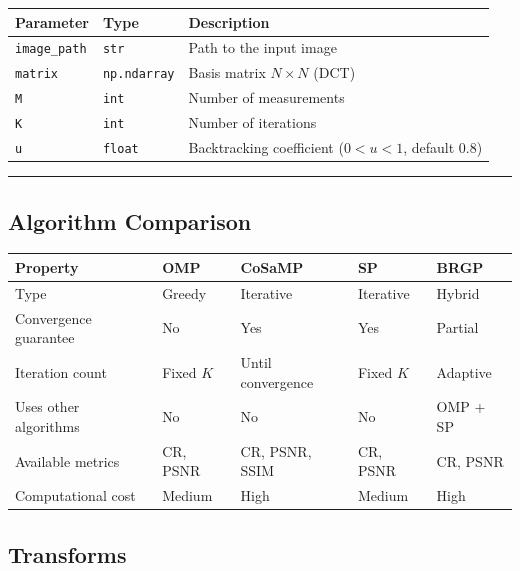\documentclass[12pt,a4paper]{article}
\newcommand{\cs}[1]{\texttt{#1}}          %
\begin{document}
\begin{center}
\begin{tabular}{lll}
  \toprule
  Parameter        & Type            & Description \\
  \midrule
  \cs{image\_path} & \cs{str}        & Path to the input image \\
  \cs{matrix}      & \cs{np.ndarray} & Basis matrix $N \times N$ (DCT) \\
  \cs{M}           & \cs{int}        & Number of measurements \\
  \cs{K}           & \cs{int}        & Number of iterations \\
  \cs{u}           & \cs{float}      & Backtracking coefficient ($0 < u < 1$, default 0.8) \\
  \bottomrule
\end{tabular}
\end{center}

\bigskip\hrule\bigskip

\subsection{Algorithm Comparison}

\begin{center}
\begin{tabular}{lllll}
  \toprule
  Property                & OMP      & CoSaMP            & SP       & BRGP     \\
  \midrule
  Type                    & Greedy   & Iterative         & Iterative & Hybrid   \\
  Convergence guarantee   & No       & Yes               & Yes       & Partial  \\
  Iteration count         & Fixed $K$& Until convergence & Fixed $K$ & Adaptive \\
  Uses other algorithms   & No       & No                & No        & OMP + SP \\
  Available metrics       & CR, PSNR & CR, PSNR, SSIM    & CR, PSNR  & CR, PSNR \\
  Computational cost      & Medium   & High              & Medium    & High     \\
  \bottomrule
\end{tabular}
\end{center}

\subsection{Transforms}
\end{document}
